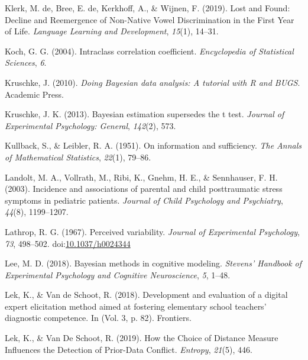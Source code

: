 \documentclass[openright,titlepage,12pt,a4paper]{book}
\begin{document}
\leavevmode\hypertarget{ref-de_klerk_lost_2019}{}%
Klerk, M. de, Bree, E. de, Kerkhoff, A., \& Wijnen, F. (2019). Lost and Found: Decline and Reemergence of Non-Native Vowel Discrimination in the First Year of Life. \emph{Language Learning and Development}, \emph{15}(1), 14--31.

\leavevmode\hypertarget{ref-koch_intraclass_2004}{}%
Koch, G. G. (2004). Intraclass correlation coefficient. \emph{Encyclopedia of Statistical Sciences}, \emph{6}.

\leavevmode\hypertarget{ref-kruschke_doing_2010}{}%
Kruschke, J. (2010). \emph{Doing Bayesian data analysis: A tutorial with R and BUGS}. Academic Press.

\leavevmode\hypertarget{ref-kruschke_bayesian_2013}{}%
Kruschke, J. K. (2013). Bayesian estimation supersedes the t test. \emph{Journal of Experimental Psychology: General}, \emph{142}(2), 573.

\leavevmode\hypertarget{ref-kullback_information_1951}{}%
Kullback, S., \& Leibler, R. A. (1951). On information and sufficiency. \emph{The Annals of Mathematical Statistics}, \emph{22}(1), 79--86.

\leavevmode\hypertarget{ref-landolt_incidence_2003}{}%
Landolt, M. A., Vollrath, M., Ribi, K., Gnehm, H. E., \& Sennhauser, F. H. (2003). Incidence and associations of parental and child posttraumatic stress symptoms in pediatric patients. \emph{Journal of Child Psychology and Psychiatry}, \emph{44}(8), 1199--1207.

\leavevmode\hypertarget{ref-lathrop_perceived_1967}{}%
Lathrop, R. G. (1967). Perceived variability. \emph{Journal of Experimental Psychology}, \emph{73}, 498--502. doi:\href{https://doi.org/10.1037/h0024344}{10.1037/h0024344}

\leavevmode\hypertarget{ref-lee_bayesian_2018}{}%
Lee, M. D. (2018). Bayesian methods in cognitive modeling. \emph{Stevens' Handbook of Experimental Psychology and Cognitive Neuroscience}, \emph{5}, 1--48.

\leavevmode\hypertarget{ref-lek_development_2018}{}%
Lek, K., \& Van de Schoot, R. (2018). Development and evaluation of a digital expert elicitation method aimed at fostering elementary school teachers' diagnostic competence. In (Vol. 3, p. 82). Frontiers.

\leavevmode\hypertarget{ref-lek_how_2019}{}%
Lek, K., \& Van De Schoot, R. (2019). How the Choice of Distance Measure Influences the Detection of Prior-Data Conflict. \emph{Entropy}, \emph{21}(5), 446.
\end{document}
